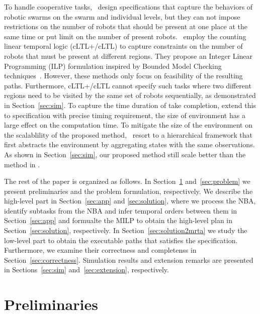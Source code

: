 \documentclass[Afour,sageh,times]{sagej}
\begin{document}
To handle cooperative tasks,~\cite{moarref2017decentralized} design specifications that capture the behaviors of robotic swarms on the swarm and individual levels, but they can not impose restrictions on  the number of robots that should be present at one place at the same time or put limit on the number of present robots.~\cite{sahin2017provably,sahin2017synchronous,sahin2019multirobot} employ the counting linear temporal logic (cLTL+/cLTL) to capture constraints on the number of robots that must be present at different regions. They  propose  an Integer Linear Programming (ILP) formulation inspired by Bounded Model Checking techniques~\citep{biere2006linear}. However, these methods only focus on feasibility of the resulting paths. Furthermore, cLTL+/cLTL cannot specify such tasks where two different regions need to be visited by the same set of robots sequentially, as demonstrated in Section~\ref{sec:sim}. To capture the time duration of take completion, \cite{JoLeVaSaSeTrBe-ISRR-2019} extend this to specification with precise timing requirement, the size of environment has a large effect on the computation time. To mitigate the size of the environment on the scalablility of the proposed method,~\cite{sahin2019multi} resort to a hierarchical framework that first abstracts the environment by aggregating states with the same observations. As shown in Section~\ref{sec:sim}, our proposed method still scale better than the method in \cite{sahin2019multi}.

The rest of the paper is organized as follows. %
In Section~\ref{sec:preliminaries} and~\ref{sec:problem} we present preliminaries and the problem formulation, respectively. We describe the high-level part in  Section~\ref{sec:app} and \ref{sec:solution}, where we process the NBA, identify subtasks from the NBA and infer temporal orders between them in Section~\ref{sec:app} and formualte the MILP to obtain the high-level plan in Section~\ref{sec:solution}, respectively. In Section~\ref{sec:solution2mrta} we study the low-level part to obtain the executable paths that satisfies the specification.  Furthermore, we examine their correctness and completenss  in Section~\ref{sec:correctness}. Simulation results and extension remarks are presented in Sections~\ref{sec:sim} and~\ref{sec:extension}, respectively.


\section{Preliminaries}\label{sec:preliminaries}
\end{document}
